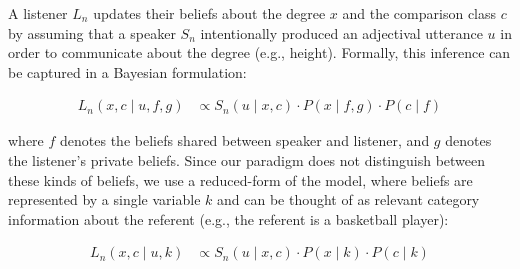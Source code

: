 \documentclass[doc]{apa6}
\begin{document}

%
%
%
%
%

A listener $L_n$ updates their beliefs about the degree $x$ and the comparison class $c$ by assuming that a speaker $S_n$ intentionally produced an adjectival utterance $u$ in order to communicate about the degree (e.g., height).
Formally, this inference can be captured in a Bayesian formulation:

\begin{align}
L_n(x, c \mid u, f, g) &\propto S_n(u \mid x, c) \cdot P(x \mid f, g) \cdot P(c \mid f) \label{eq:L2} 
\end{align}

\noindent where $f$ denotes the beliefs shared between speaker and listener, and $g$ denotes the listener's private beliefs. Since our paradigm does not distinguish between these kinds of beliefs, we use a reduced-form of the model, where beliefs are represented by a single variable $k$ and can be thought of as relevant category information about the referent (e.g., the referent is a basketball player): 

\begin{align}
L_n(x, c \mid u, k) &\propto S_n(u \mid x, c) \cdot P(x \mid k) \cdot P(c \mid k) \label{eq:L2} 
\end{align}
\end{document}

